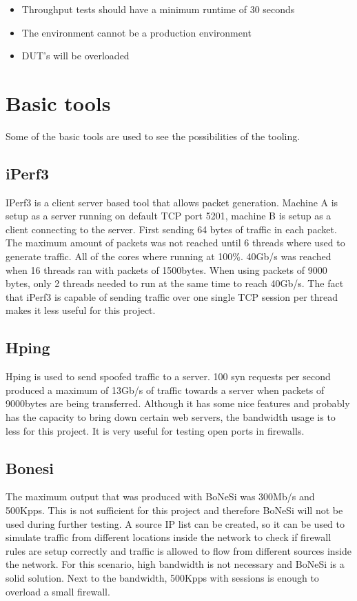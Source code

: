 \begin{itemize}
\item{Throughput tests should have a minimum runtime of 30 seconds}
\item{The environment cannot be a production environment}
\item{DUT's will be overloaded}
\end{itemize} 

\section{Basic tools}
Some of the basic tools are used to see the possibilities of the tooling. 
\subsection{iPerf3}
IPerf3 is a client server based tool that allows packet generation. Machine A is setup as a server running on default TCP port 5201, machine B is setup as a client connecting to the server. 
First sending 64 bytes of traffic in each packet. The maximum amount of packets was not reached until 6 threads where used to generate traffic. All of the cores where running at 100\%. 40Gb/s was reached when 16 threads ran with packets of 1500bytes. When using packets of 9000 bytes, only 2 threads needed to run at the same time to reach 40Gb/s. The fact that iPerf3 is capable of sending traffic over one single TCP session per thread makes it less useful for this project.

\subsection{Hping}
Hping is used to send spoofed traffic to a server. 100 syn requests per second produced a maximum of 13Gb/s of traffic towards a server when packets of 9000bytes are being transferred. Although it has some nice features and probably has the capacity to bring down certain web servers, the bandwidth usage is to less for this project. It is very useful for testing open ports in firewalls.  

\subsection{Bonesi}
The maximum output that was produced with BoNeSi was 300Mb/s and 500Kpps. This is not sufficient for this project and therefore BoNeSi will not be used during further testing. A source IP list can be created, so it can be used to simulate traffic from different locations inside the network to check if firewall rules are setup correctly and traffic is allowed to flow from different sources inside the network. For this scenario, high bandwidth is not necessary and BoNeSi is a solid solution. Next to the bandwidth, 500Kpps with sessions is enough to overload a small firewall.  

